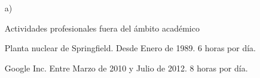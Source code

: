 \begin{enumerate}[leftmargin=0.8cm]

  \item[a)]{Actividades profesionales fuera del ámbito académico

    \begin{itemize}[leftmargin=0.2cm]

      {Planta nuclear de Springfield.}
      {Desde Enero de 1989. 6 horas por día.}
      {}

      {Google Inc.}
      {Entre Marzo de 2010 y Julio de 2012. 8 horas por día.}
      {}

    \end{itemize}

  }

\end{enumerate}
